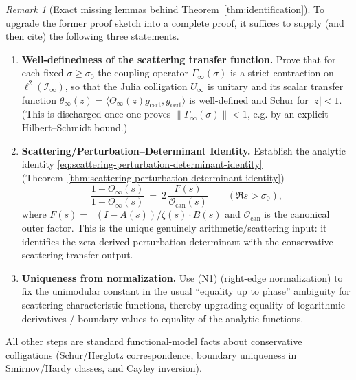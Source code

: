 \documentclass[11pt]{article}
\theoremstyle{definition}
\theoremstyle{remark}
\newtheorem{remark}[theorem]{Remark}
\theoremstyle{definition}
\DeclareMathOperator{\dettwo}{det_2}
\begin{document}
\begin{remark}[Exact missing lemmas behind Theorem~\ref{thm:identification}]\label{rem:missing-identification-lemmas}
To upgrade the former proof sketch into a complete proof, it suffices to supply (and then cite) the following three statements.
\begin{enumerate}
  \item \textbf{Well-definedness of the scattering transfer function.}
  Prove that for each fixed $\sigma\ge\sigma_0$ the coupling operator $\Gamma_\infty(\sigma)$ is a strict contraction on $\ell^2(\mathcal I_\infty)$, so that the Julia colligation $U_\infty$ is unitary and its scalar transfer function
  $\theta_\infty(z)=\langle \Theta_\infty(z)g_{\mathrm{cert}},g_{\mathrm{cert}}\rangle$ is well-defined and Schur for $|z|<1$.
  (This is discharged once one proves $\|\Gamma_\infty(\sigma)\|<1$, e.g. by an explicit Hilbert--Schmidt bound.)

  \item \textbf{Scattering/Perturbation--Determinant Identity.}
  Establish the analytic identity \eqref{eq:scattering-perturbation-determinant-identity} (Theorem~\ref{thm:scattering-perturbation-determinant-identity})
  \[
    \frac{1+\Theta_\infty(s)}{1-\Theta_\infty(s)}\ =\ 2\,\frac{F(s)}{\mathcal O_{\mathrm{can}}(s)}
    \qquad(\Re s>\sigma_0),
  \]
  where $F(s)=\dettwo(I-A(s))/\zeta(s)\cdot B(s)$ and $\mathcal O_{\mathrm{can}}$ is the canonical outer factor.
  This is the unique genuinely arithmetic/scattering input: it identifies the zeta-derived perturbation determinant with the conservative scattering transfer output.

  \item \textbf{Uniqueness from normalization.}
  Use (N1) (right-edge normalization) to fix the unimodular constant in the usual ``equality up to phase'' ambiguity for scattering characteristic functions, thereby upgrading equality of logarithmic derivatives / boundary values to equality of the analytic functions.
\end{enumerate}
\noindent All other steps are standard functional-model facts about conservative colligations (Schur/Herglotz correspondence, boundary uniqueness in Smirnov/Hardy classes, and Cayley inversion).
\end{remark}
\end{document}
